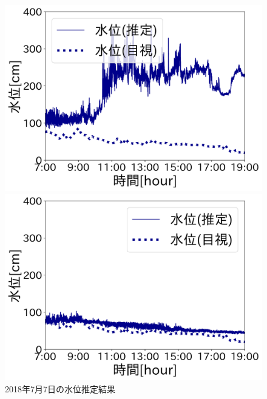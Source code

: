 \documentclass[a4j,twocolumn,10pt]{jarticle}
\begin{document}
\begin{figure}[t]
    \begin{minipage}[b]{0.49\linewidth}
      \centering
      \includegraphics[keepaspectratio,scale=0.2]{graph/A.png}
      \vspace{-5mm}
    \end{minipage}
    \begin{minipage}[b]{0.49\linewidth}
      \centering
      \includegraphics[keepaspectratio,scale=0.2]{graph/SS.png}
      \vspace{-5mm}
    \end{minipage}
    \vspace{-7mm}
    \caption{2018年7月7日の水位推定結果}
    \vspace{-6mm}
    \label{graph}
\end{figure}
\end{document}
